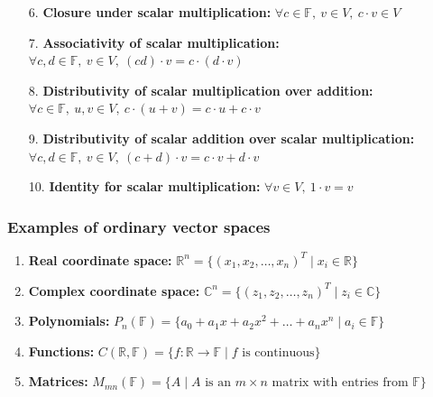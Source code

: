 \documentclass[fullscreen=true, bookmarks=true, hyperref={pdfencoding=unicode}]{beamer}
\begin{document}
\begin{frame}
  \begin{enumerate}
    \item[6.] \textbf{Closure under scalar multiplication:} $\forall c \in \mathbb{F},\ v \in V,\ c\cdot v \in V$
    \item[7.] \textbf{Associativity of scalar multiplication:} $\forall c, d \in \mathbb{F},\ v \in V,\ (cd)\cdot v = c\cdot(d\cdot v)$
    \item[8.] \textbf{Distributivity of scalar multiplication over addition:} $\forall c \in \mathbb{F},\ u, v \in V,\ c\cdot(u + v) = c\cdot u + c\cdot v$
    \item[9.] \textbf{Distributivity of scalar addition over scalar multiplication:} $\forall c, d \in \mathbb{F},\ v \in V,\ (c + d)\cdot v = c\cdot v + d\cdot v$
    \item[10.] \textbf{Identity for scalar multiplication:} $\forall v \in V,\ 1\cdot v = v$
  \end{enumerate}
\end{frame}


\begin{frame}
  \frametitle{Examples of ordinary vector spaces}
  \begin{enumerate}
    \item \textbf{Real coordinate space:} $\mathbb{R}^n = \{(x_1, x_2, \ldots, x_n)^T \mid x_i \in \mathbb{R}\}$
    \item \textbf{Complex coordinate space:} $\mathbb{C}^n = \{(z_1, z_2, \ldots, z_n)^T \mid z_i \in \mathbb{C}\}$
    \pause
    \item \textbf{Polynomials:} $P_n(\mathbb{F}) = \{a_0 + a_1x + a_2x^2 + \ldots + a_nx^n \mid a_i \in \mathbb{F}\}$
    \item \textbf{Functions:} $C(\mathbb{R}, \mathbb{F}) = \{f: \mathbb{R} \to \mathbb{F} \mid f \text{ is continuous}\}$
    \pause
    \item \textbf{Matrices:} $M_{mn}(\mathbb{F}) = \{A \mid A \text{ is an } m \times n \text{ matrix with entries from } \mathbb{F}\}$   
  \end{enumerate}
\end{frame}
\end{document}
